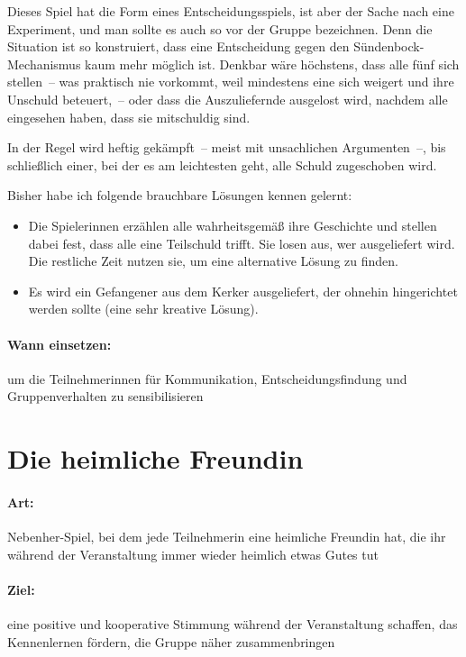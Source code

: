 Dieses Spiel hat die Form eines Entscheidungsspiels, ist aber der Sache nach eine Experiment, und man sollte es auch so vor der Gruppe bezeichnen. Denn die Situation ist so konstruiert, dass eine Entscheidung gegen den Sündenbock-Mechanismus kaum mehr möglich ist. Denkbar wäre höchstens, dass alle fünf sich stellen~-- was praktisch nie vorkommt, weil mindestens eine sich weigert und ihre Unschuld beteuert,~-- oder dass die Auszuliefernde ausgelost wird, nachdem alle eingesehen haben, dass sie mitschuldig sind.

In der Regel wird heftig gekämpft~-- meist mit unsachlichen Argumenten~--, bis schließlich einer, bei der es am leichtesten geht, alle Schuld zugeschoben wird.

Bisher habe ich folgende brauchbare Lösungen kennen gelernt:
\begin{itemize}
  \item Die Spielerinnen erzählen alle wahrheitsgemäß ihre Geschichte und stellen dabei fest, dass alle eine Teilschuld trifft. Sie losen aus, wer ausgeliefert wird. Die restliche Zeit nutzen sie, um eine alternative Lösung zu finden.
  \item Es wird ein Gefangener aus dem Kerker ausgeliefert, der ohnehin hingerichtet werden sollte (eine sehr kreative Lösung).
\end{itemize}

\paragraph{Wann einsetzen:} um die Teilnehmerinnen für Kommunikation, Entscheidungsfindung und Gruppenverhalten zu sensibilisieren

\section{Die heimliche Freundin}
\paragraph{Art:} Nebenher-Spiel, bei dem jede Teilnehmerin eine heimliche Freundin hat, die ihr während der Veranstaltung immer wieder heimlich etwas Gutes tut
\paragraph{Ziel:} eine positive und kooperative Stimmung während der Veranstaltung schaffen, das Kennenlernen fördern, die Gruppe näher zusammenbringen
